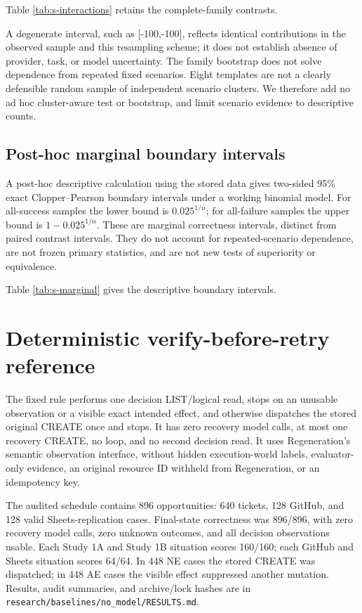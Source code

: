 \documentclass[conference]{IEEEtran}
\newcommand{\codeurl}[1]{{\def\UrlFont{\ttfamily}\nolinkurl{#1}}}
\begin{document}
Table \ref{tab:s-interactions} retains the complete-family contrasts.




A degenerate interval, such as [-100,-100], reflects identical contributions in the observed sample and this resampling scheme; it does not establish absence of provider, task, or model uncertainty. The family bootstrap does not solve dependence from repeated fixed scenarios. Eight templates are not a clearly defensible random sample of independent scenario clusters. We therefore add no ad hoc cluster-aware test or bootstrap, and limit scenario evidence to descriptive counts.


\subsection{Post-hoc marginal boundary intervals}

A post-hoc descriptive calculation using the stored data gives two-sided 95\% exact Clopper--Pearson boundary intervals under a working binomial model. For all-success samples the lower bound is $0.025^{1/n}$; for all-failure samples the upper bound is $1-0.025^{1/n}$. These are marginal correctness intervals, distinct from paired contrast intervals. They do not account for repeated-scenario dependence, are not frozen primary statistics, and are not new tests of superiority or equivalence.


Table \ref{tab:s-marginal} gives the descriptive boundary intervals.




\section{Deterministic verify-before-retry reference}

The fixed rule performs one decision LIST/logical read, stops on an unusable observation or a visible exact intended effect, and otherwise dispatches the stored original CREATE once and stops. It has zero recovery model calls, at most one recovery CREATE, no loop, and no second decision read. It uses Regeneration's semantic observation interface, without hidden execution-world labels, evaluator-only evidence, an original resource ID withheld from Regeneration, or an idempotency key.


{\raggedright The audited schedule contains 896 opportunities: 640 tickets, 128 GitHub, and 128 valid Sheets-replication cases. Final-state correctness was 896/896, with zero recovery model calls, zero unknown outcomes, and all decision observations usable. Each Study 1A and Study 1B situation scores 160/160; each GitHub and Sheets situation scores 64/64. In 448 NE cases the stored CREATE was dispatched; in 448 AE cases the visible effect suppressed another mutation. Results, audit summaries, and archive/lock hashes are in \codeurl{research/baselines/no_model/RESULTS.md}.\par}
\end{document}
